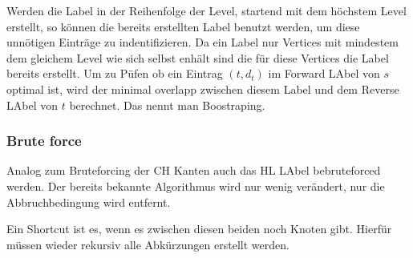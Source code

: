 Werden die Label in der Reihenfolge der Level, startend mit dem höchstem Level erstellt, so können die bereits erstellten Label benutzt werden, um diese unnötigen Einträge zu indentifizieren.
Da ein Label nur Vertices mit mindestem dem gleichem Level wie sich selbst enhält sind die für diese Vertices die Label bereits erstellt.
Um zu Püfen ob ein Eintrag $(t, d_t)$ im Forward LAbel von $s$ optimal ist, wird der minimal overlapp zwischen diesem Label und dem Reverse LAbel von $t$ berechnet.
Das nennt man Boostraping.

\subsubsection{Brute force}

Analog zum Bruteforcing der CH Kanten auch das HL LAbel bebruteforced werden.
Der bereits bekannte Algorithmus wird nur wenig verändert, nur die Abbruchbedingung wird entfernt.


Ein Shortcut ist es, wenn es zwischen diesen beiden noch Knoten gibt.
Hierfür müssen wieder rekursiv alle Abkürzungen erstellt werden.